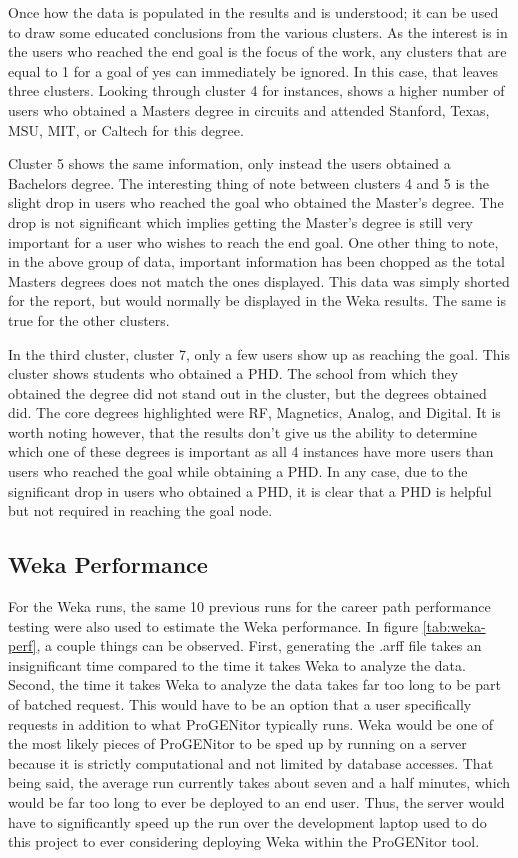 Once how the data is populated in the results and is understood; it can be used
to draw some educated conclusions from the various clusters.  As the interest
is in the users who reached the end goal is the focus of the work, any clusters that are equal to
1 for a goal of yes can immediately be ignored.  In this case, that leaves three
clusters.  Looking through cluster 4 for instances, shows a higher number of
users who obtained a Masters degree in circuits and attended Stanford, Texas,
MSU, MIT, or Caltech for this degree.  

Cluster 5 shows the same information, only instead the users obtained a
Bachelors degree.  The interesting thing of note between clusters 4 and 5 is the
slight drop in users who reached the goal who obtained the Master's degree.  The
drop is not significant which implies getting the Master's degree is still very
important for a user who wishes to reach the end goal.  One other thing to note,
in the above group of data, important information has been chopped as the total
Masters degrees does not match the ones displayed.  This data was simply shorted
for the report, but would normally be displayed in the Weka results.  The same
is true for the other clusters.  

In the third cluster, cluster 7, only a few users show up as reaching the goal. 
This cluster shows students who obtained a PHD.  The school from which they
obtained the degree did not stand out in the cluster, but the degrees obtained
did.  The core degrees highlighted were RF, Magnetics, Analog, and Digital.  It
is worth noting however, that the results don't give us the ability to determine
which one of these degrees is important as all 4 instances have more users than
users who reached the goal while obtaining a PHD.  In any case, due to the
significant drop in users who obtained a PHD, it is clear that a PHD is helpful
but not required in reaching the goal node.

\subsection{Weka Performance}
For the Weka runs, the same 10 previous runs for the career path performance
testing were also used to estimate the Weka performance.  In figure
\ref{tab:weka-perf}, a couple things can be observed.  First, generating the
.arff file takes an insignificant time compared to the time it takes Weka to
analyze the data.  Second, the time it takes Weka to analyze the data takes far
too long to be part of batched request.  This would have to be an option that a
user specifically requests in addition to what ProGENitor typically runs.  Weka
would be one of the most likely pieces of ProGENitor to be sped up by running on
a server because it is strictly computational and not limited by database
accesses.  That being said, the average run currently takes about seven and a
half minutes, which would be far too long to ever be deployed to an end user. 
Thus, the server would have to significantly speed up the run over the
development laptop used to do this project to ever considering deploying Weka
within the ProGENitor tool.

